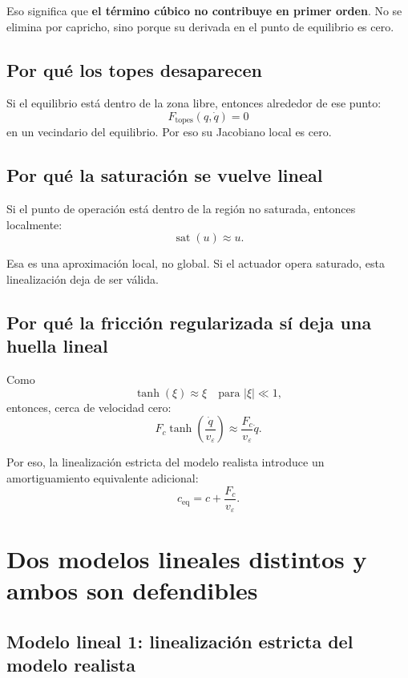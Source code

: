 \documentclass[11pt]{article}
\begin{document}
Eso significa que \textbf{el t\'ermino c\'ubico no contribuye en primer orden}. No se elimina por capricho, sino porque su derivada en el punto de equilibrio es cero.

\subsection{Por qu\'e los topes desaparecen}

Si el equilibrio est\'a dentro de la zona libre, entonces alrededor de ese punto:
\[
F_{\text{topes}}(q,\dot q)=0
\]
en un vecindario del equilibrio. Por eso su Jacobiano local es cero.

\subsection{Por qu\'e la saturaci\'on se vuelve lineal}

Si el punto de operaci\'on est\'a dentro de la regi\'on no saturada, entonces localmente:
\[
\operatorname{sat}(u)\approx u.
\]

Esa es una aproximaci\'on local, no global. Si el actuador opera saturado, esta linealizaci\'on deja de ser v\'alida.

\subsection{Por qu\'e la fricci\'on regularizada s\'i deja una huella lineal}

Como
\[
\tanh(\xi)\approx \xi \quad \text{para } |\xi|\ll 1,
\]
entonces, cerca de velocidad cero:
\begin{equation}
F_c\tanh\left(\frac{\dot q}{v_\varepsilon}\right)
\approx
\frac{F_c}{v_\varepsilon}\dot q.
\label{eq:fric_lin}
\end{equation}

Por eso, la linealizaci\'on estricta del modelo realista introduce un amortiguamiento equivalente adicional:
\begin{equation}
c_{\text{eq}} = c + \frac{F_c}{v_\varepsilon}.
\label{eq:ceq}
\end{equation}

\section{Dos modelos lineales distintos y ambos son defendibles}

\subsection{Modelo lineal 1: linealizaci\'on estricta del modelo realista}
\end{document}
